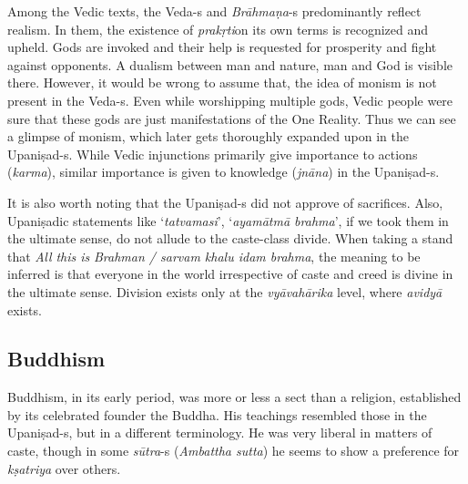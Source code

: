 Among the Vedic texts, the Veda-s and \textit{Brāhmaṇa}-s predominantly reflect realism. In them, the existence of \textit{prakṛti}on its own terms is recognized and upheld. Gods are invoked and their help is requested for prosperity and fight against opponents. A dualism between man and nature, man and God is visible there. However, it would be wrong to assume that, the idea of monism is not present in the Veda-s. Even while worshipping multiple gods, Vedic people were sure that these gods are just manifestations of the One Reality. Thus we can see a glimpse of monism, which later gets thoroughly expanded upon in the Upaniṣad-s. While Vedic injunctions primarily give importance to actions (\textit{karma}), similar importance is given to knowledge (\textit{jnāna}) in the Upaniṣad-s.

It is also worth noting that the Upaniṣad-s did not approve of sacrifices. Also, Upaniṣadic statements like ‘\textit{tatvamasi}’, ‘\textit{ayamātmā brahma}’, if we took them in the ultimate sense, do not allude to the caste-class divide. When taking a stand that \textit{All this is} \textit{Brahman / sarvam khalu idam brahma}, the meaning to be inferred is that everyone in the world irrespective of caste and creed is divine in the ultimate sense. Division exists only at the \textit{vyāvahārika} level, where \textit{avidyā} exists.

\newpage

\subsection*{Buddhism}

Buddhism, in its early period, was more or less a sect than a religion, established by its celebrated founder the Buddha. His teachings resembled those in the Upaniṣad-s, but in a different terminology. He was very liberal in matters of caste, though in some \textit{sūtra}-s (\textit{Ambattha sutta}) he seems to show a preference for \textit{kṣatriya} over others.

